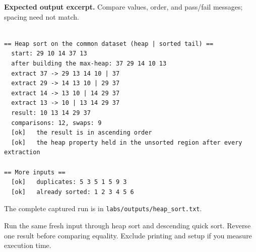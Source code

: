 \textbf{Expected output excerpt.} Compare values, order, and pass/fail messages; spacing need not match.

\begin{lstlisting}[style=utpterminal,language={}]

== Heap sort on the common dataset (heap | sorted tail) ==
  start: 29 10 14 37 13 
  after building the max-heap: 37 29 14 10 13 
  extract 37 -> 29 13 14 10 | 37 
  extract 29 -> 14 13 10 | 29 37 
  extract 14 -> 13 10 | 14 29 37 
  extract 13 -> 10 | 13 14 29 37 
  result: 10 13 14 29 37 
  comparisons: 12, swaps: 9
  [ok]   the result is in ascending order
  [ok]   the heap property held in the unsorted region after every extraction

== More inputs ==
  [ok]   duplicates: 5 3 5 1 5 9 3
  [ok]   already sorted: 1 2 3 4 5 6

\end{lstlisting}

The complete captured run is in \texttt{labs/outputs/heap\_sort.txt}.

\begin{tryit}

Run the same fresh input through heap sort and descending quick sort. Reverse one result before comparing equality. Exclude printing and setup if you measure execution time.

\end{tryit}
